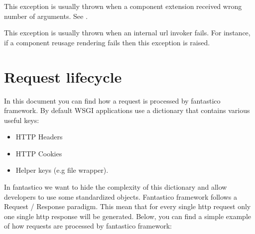 \documentclass[letterpaper,10pt,english]{sphinxmanual}
\begin{document}

\begin{fulllineitems}
\label{features/exceptions:fantastico.exceptions.FantasticoInsufficientArgumentsError}
This exception is usually thrown when a component extension received wrong number of arguments. See
{\hyperref[features/component_reusage:fantastico.rendering.component.Component]{}}.

\end{fulllineitems}


\begin{fulllineitems}
\label{features/exceptions:fantastico.exceptions.FantasticoUrlInvokerError}
This exception is usually thrown when an internal url invoker fails. For instance, if a component reusage rendering
fails then this exception is raised.

\end{fulllineitems}



\section{Request lifecycle}
\label{features/request_response:request-lifecycle}\label{features/request_response::doc}
In this document you can find how a request is processed by fantastico framework. By default WSGI applications use a dictionary
that contains various useful keys:
\begin{itemize}
\item {} 
HTTP Headers

\item {} 
HTTP Cookies

\item {} 
Helper keys (e.g file wrapper).

\end{itemize}

In fantastico we want to hide the complexity of this dictionary and allow developers to use some standardized objects. Fantastico
framework follows a Request / Response paradigm. This mean that for every single http request only one single http response will
be generated. Below, you can find a simple example of how requests are processed by fantastico framework:
\end{document}
